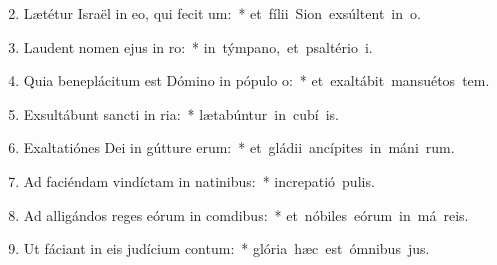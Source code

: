 \begin{flushleft}
\begin{enumerate}[leftmargin=*]
\setcounter{enumi}{1}

\item Lætétur Israël in eo, qui fecit um:~* \mbox{et fílii Sion exsúltent in  o.}
\item Laudent nomen ejus in ro:~* \mbox{in týmpano, et psaltério  i.}
\item Quia beneplácitum est Dómino in pópulo o:~* \mbox{et exaltábit mansuétos  tem.}
\item Exsultábunt sancti in ria:~* \mbox{lætabúntur in cubí is.}
\item Exaltatiónes Dei in gútture erum:~* \mbox{et gládii ancípites in máni rum.}
\item Ad faciéndam vindíctam in natinibus:~* \mbox{increpatió  pulis.}
\item Ad alligándos reges eórum in comdibus:~* \mbox{et nóbiles eórum in má reis.}
\item Ut fáciant in eis judícium contum:~* \mbox{glória hæc est ómnibus  jus.}

\end{enumerate}
\end{flushleft}

